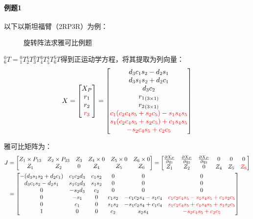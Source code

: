 \documentclass[
12pt, %
a4paper, 
oneside, %
headinclude,footinclude, %
]{scrartcl}
\begin{document}
\paragraph{例题1}
{\footnotesize
以下以斯坦福臂（2RP3R）为例：

\begin{figure}[H]
\centering
\subfloat[斯坦福臂结构图]{\texttt{[image: 4.1]}} \quad
\subfloat[参数表]{\texttt{[image: 4.2]}}
\caption[旋转阵法求雅可比例题]{旋转阵法求雅可比例题}
\end{figure}

$ _6^0T = {_1^0T}{_2^1T}{_3^2T}{_4^3T}{_5^4T}{_6^5T} $得到正运动学方程，将其提取为列向量：
$$
X = \begin{bmatrix} X_P \\ r_1 \\ r_2 \\ \textcolor{red}{r_3} \end{bmatrix}
= \begin{bmatrix} d_3 c_1 s_2 - d_2 s_1 \\ d_3 s_1 s_2 + d_2 c_1 \\ d_3 c_2 \\ {r_1}_{(3 \times 1)} \\ {r_2}_{(3 \times 1)} \\ \textcolor{red}{c_1(c_2 c_4 s_5 + s_2 c_5) - s_1 s_4 s_5} \\ \textcolor{red}{s_1(c_2 c_4 s_5 + s_2 c_5) + c_1 s_4 s_5} \\ \textcolor{red}{-s_2 c_4 s_5 + c_2 c_5} \end{bmatrix}
$$

雅可比矩阵为：
\begin{align*}
J &= \begin{bmatrix} Z_1 \times P_{13} & Z_2 \times P_{23} & Z_3 & Z_4 \times 0 & Z_5 \times 0 & Z_6 \times 0 \\ Z_1 & Z_2 & 0 & Z_4 & Z_5 & Z_6 \end{bmatrix}
= \begin{bmatrix} \frac{\partial X_P}{\partial q_1} & \frac{\partial X_P}{\partial q_2} & \frac{\partial X_P}{\partial q_3} & 0 & 0 & 0 \\ Z_1 & Z_2 & 0 & Z_4 & Z_5 & \textcolor{red}{Z_6} \end{bmatrix} \\
&= \begin{bmatrix} -(d_3 s_1 s_2 + d_2 c_1) & c_1 c_2 d_3 & c_1 s_2 & 0 & 0 & 0 \\ d_3 c_1 s_2 - d_2 s_1 & s_1 c_2 d_3 & s_1 s_2 & 0 & 0 & 0 \\ 0 & -s_2 d_3 & c_2 & 0 & 0 & 0 \\ 0 & -s_1 & 0 & c_1 s_2 & -c_1 c_2 s_4 - s_1 c_4 & \textcolor{red}{c_1 c_2 c_4 s_5 - s_1 s_4 s_5 + c_1 s_2 c_5} \\ 0 & c_1 & 0 & s_1 s_2 & -s_1 c_2 s_4 + c_1 c_4 & \textcolor{red}{s_1 c_2 c_4 s_5 + c_1 s_4 s_5 + s_1 s_2 c_5} \\ 1 & 0 & 0 & c_2 & s_2 s_4 & \textcolor{red}{-s_2 c_4 s_5 + c_2 c_5} \end{bmatrix}
\end{align*}

}
\end{document}
